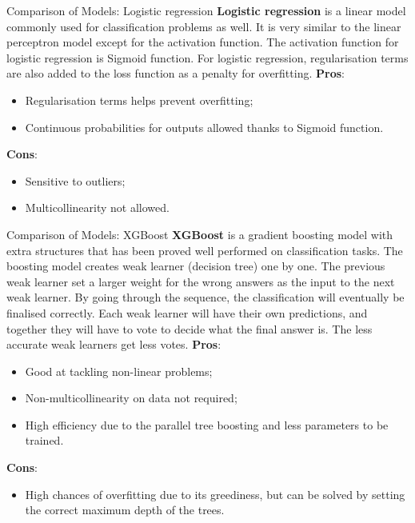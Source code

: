 \begin{frame}{Comparison of Models: Logistic regression}
\textbf{Logistic regression} is a linear model commonly used for classification problems as well. It is very similar to the linear perceptron model except for the activation function. The activation function for logistic regression is Sigmoid function. For logistic regression, regularisation terms are also added to the loss function as a penalty for overfitting.
\textbf{Pros}: 
\begin{itemize}
\item Regularisation terms helps prevent overfitting;
\item Continuous probabilities for outputs allowed thanks to Sigmoid function.
\end{itemize}
\textbf{Cons}: 
\begin{itemize}
\item Sensitive to outliers;
\item Multicollinearity not allowed.
\end{itemize}
\end{frame}


\begin{frame}{Comparison of Models: XGBoost}
\textbf{XGBoost} is a gradient boosting model with extra structures that has been proved well performed on classification tasks. The boosting model creates weak learner (decision tree) one by one. The previous weak learner set a larger weight for the wrong answers as the input to the next weak learner. By going through the sequence, the classification will eventually be finalised correctly. Each weak learner will have their own predictions, and together they will have to vote to decide what the final answer is. The less accurate weak learners get less votes.
\textbf{Pros}: 
\begin{itemize}
\item Good at tackling non-linear problems; 
\item Non-multicollinearity on data not required; 
\item High efficiency due to the parallel tree boosting and less parameters to be trained.
\end{itemize}
\textbf{Cons}: 
\begin{itemize}
\item High chances of overfitting due to its greediness, but can be solved by setting the correct maximum depth of the trees.
\end{itemize}
\end{frame}

